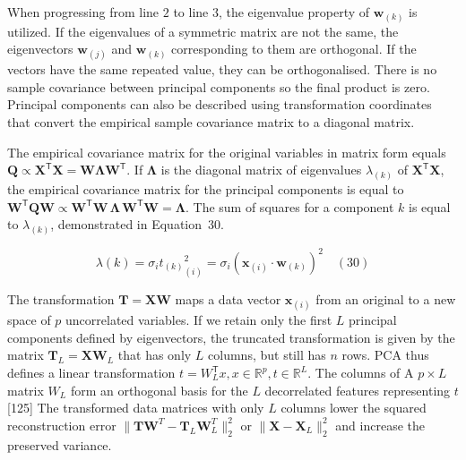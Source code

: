 \documentclass[preprint,12pt]{elsarticle}
\begin{document}
When progressing from line $2$ to line $3$, the eigenvalue property of $\mathbf{w}_{\left(k\right)}$ is utilized. If the eigenvalues of a symmetric matrix are not the same, the eigenvectors $\mathbf{w}_{\left(j\right)}$ and $\mathbf{w}_{\left(k\right)}$ corresponding to them are orthogonal. If the vectors have the same repeated value, they can be orthogonalised. There is no sample covariance between principal components so the final product is zero. Principal components can also be described using transformation coordinates that convert the empirical sample covariance matrix to a diagonal matrix.

The empirical covariance matrix for the original variables in matrix form equals $\mathbf{Q} \propto \mathbf{X}^{\mathsf{T}}\mathbf{X} =\mathbf{W} \mathbf{\Lambda} \mathbf{W}^{\mathsf{T}}$. If $\mathbf{\Lambda}$ is the diagonal matrix of eigenvalues $\lambda_{\left(k\right)}$ of $\mathbf{X}^{\mathsf{T}}\mathbf{X}$, the empirical covariance matrix for the principal components is equal to $\mathbf{W}^{\mathsf{T}}\mathbf{Q} \mathbf{W} \propto \mathbf{W}^{\mathsf{T}}\mathbf{W} \,\mathbf{\Lambda} \,\mathbf{W}^{\mathsf{T}}\mathbf{W} =\mathbf{\Lambda}$. The sum of squares for a component $k$ is equal to $\lambda_{\left(k\right)}$, demonstrated in Equation~30.

\begin{equation}
	\lambda(k) = \sigma_{i} {t_{\left(k\right)}}^{2}_{\left(i\right)} = \sigma_{i} {\left(\mathbf{x}_{\left(i\right)} \cdot \mathbf{w}_{\left(k\right)}\right)}^{2}
	\quad\left(30\right)
\end{equation}

The transformation $\mathbf{T} = \mathbf{X} \mathbf{W}$ maps a data vector $\mathbf{x}_{\left(i\right)}$ from an original to a new space of $p$ uncorrelated variables. If we retain only the first $L$ principal components defined by eigenvectors, the truncated transformation is given by the matrix $\mathbf{T}_{L}=\mathbf{X} \mathbf{W}_{L}$ that has only $L$ columns, but still has $n$ rows. PCA thus defines a linear transformation $t=W_{L}^{\mathsf{T}}x,x\in \mathbb{R}^{p},t\in \mathbb{R}^{L}$. The columns of A $p \times L$ matrix $W_{L}$ form an orthogonal basis for the $L$ decorrelated features representing $t$ [125] The transformed data matrices with only $L$ columns lower the squared reconstruction error $\|\mathbf{T} \mathbf{W}^{T}-\mathbf{T}_{L}\mathbf{W}_{L}^{T}\|_{2}^{2}$ or  $\|\mathbf{X} -\mathbf{X}_{L}\|_{2}^{2}$ and increase the preserved variance.
\end{document}
